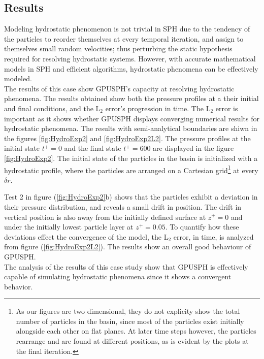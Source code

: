 \documentclass{../GPUSPHtemplate}
\begin{document}
\subsection{Results}
Modeling hydrostatic phenomenon is not trivial in SPH due to the tendency of the particles
to reorder themselves at every temporal iteration, and assign to themselves small random velocities;
thus perturbing the static hypothesis required for resolving hydrostatic systems. However, with accurate
mathematical models in SPH and efficient algorithms, hydrostatic phenomena can be effectively modeled.\\

The results of this case show GPUSPH's capacity at resolving hydrostatic phenomena. The results obtained show
both the pressure profiles at a their initial and final conditions, and the L$_2$ error's progression in time.
The L$_2$ error is important as it shows whether
GPUSPH displays converging numerical results for hydrostatic phenomena.
The results with semi-analytical boundaries are shiwn in the figures \ref{fig:HydroExp2} and \ref{fig:HydroExp2L2}.
The pressure profiles at the initial state $t^+=0$ and the final state $t^+=600$ are displayed in the figure \ref{fig:HydroExp2}.
The initial state of the particles in the basin is initialized with a hydrostatic profile, where the particles are arranged
on a Cartesian grid\footnote{As our figures are two dimensional, they do not explicity show the total
  number of particles in the basin, since most of the particles exist initially alongside each other on flat planes.
  At later time steps however, the particles rearrange and are found at different positions, as is evident
  by the plots at the final iteration.} at every $\delta r$.

Test 2 in figure (\ref{fig:HydroExp2}b) shows that the particles exhibit a deviation
in their pressure distribution, and reveals a small drift in position. The drift in vertical position
is also away from the initially defined surface at $z^+=0$ and under the initially lowest particle layer
at $z^+=0.05$. To quantify how these deviations effect the convergence of the model, the L$_2$ error, in time,
is analyzed from figure (\ref{fig:HydroExp2L2}). The results show an overall good behaviour of GPUSPH.\\

The analysis of the results of this case study show that GPUSPH is effectively capable of simulating
hydrostatic phenomena since it shows a convergent behavior. 
\end{document}
